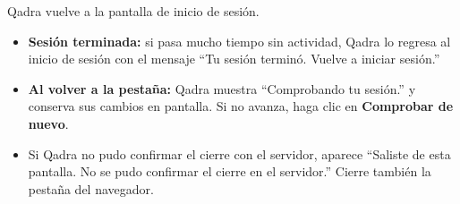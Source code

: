 \resultado Qadra vuelve a la pantalla de inicio de sesión.

\begin{itemize}
  \item \textbf{Sesión terminada:} si pasa mucho tiempo sin actividad, Qadra
        lo regresa al inicio de sesión con el mensaje \enquote{Tu sesión
        terminó. Vuelve a iniciar sesión.}
  \item \textbf{Al volver a la pestaña:} Qadra muestra \enquote{Comprobando
        tu sesión.} y conserva sus cambios en pantalla. Si no avanza, haga
        clic en \textbf{Comprobar de nuevo}.
  \item Si Qadra no pudo confirmar el cierre con el servidor, aparece
        \enquote{Saliste de esta pantalla. No se pudo confirmar el cierre en
        el servidor.} Cierre también la pestaña del navegador.
\end{itemize}
